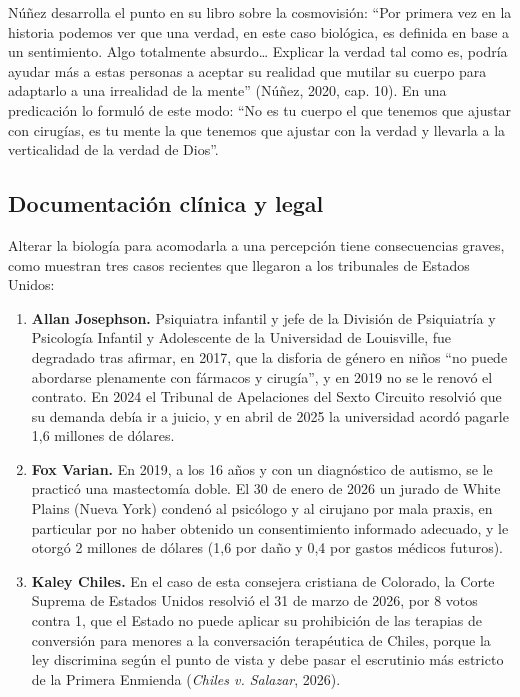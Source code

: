 Núñez desarrolla el punto en su libro sobre la cosmovisión: ``Por primera vez en la historia podemos ver que una verdad, en este caso biológica, es definida en base a un sentimiento. Algo totalmente absurdo\ldots{} Explicar la verdad tal como es, podría ayudar más a estas personas a aceptar su realidad que mutilar su cuerpo para adaptarlo a una irrealidad de la mente'' (Núñez, 2020, cap. 10). En una predicación lo formuló de este modo: ``No es tu cuerpo el que tenemos que ajustar con cirugías, es tu mente la que tenemos que ajustar con la verdad y llevarla a la verticalidad de la verdad de Dios''.


\subsection{Documentación clínica y legal}
Alterar la biología para acomodarla a una percepción tiene consecuencias graves, como muestran tres casos recientes que llegaron a los tribunales de Estados Unidos:

\begin{enumerate}
\item \textbf{Allan Josephson.} Psiquiatra infantil y jefe de la División de Psiquiatría y Psicología Infantil y Adolescente de la Universidad de Louisville, fue degradado tras afirmar, en 2017, que la disforia de género en niños ``no puede abordarse plenamente con fármacos y cirugía'', y en 2019 no se le renovó el contrato. En 2024 el Tribunal de Apelaciones del Sexto Circuito resolvió que su demanda debía ir a juicio, y en abril de 2025 la universidad acordó pagarle 1,6 millones de dólares.
\item \textbf{Fox Varian.} En 2019, a los 16 años y con un diagnóstico de autismo, se le practicó una mastectomía doble. El 30 de enero de 2026 un jurado de White Plains (Nueva York) condenó al psicólogo y al cirujano por mala praxis, en particular por no haber obtenido un consentimiento informado adecuado, y le otorgó 2 millones de dólares (1,6 por daño y 0,4 por gastos médicos futuros).
\item \textbf{Kaley Chiles.} En el caso de esta consejera cristiana de Colorado, la Corte Suprema de Estados Unidos resolvió el 31 de marzo de 2026, por 8 votos contra 1, que el Estado no puede aplicar su prohibición de las terapias de conversión para menores a la conversación terapéutica de Chiles, porque la ley discrimina según el punto de vista y debe pasar el escrutinio más estricto de la Primera Enmienda (\emph{Chiles v. Salazar}, 2026).
\end{enumerate}

